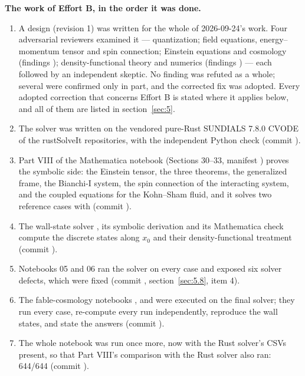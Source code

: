 \textbf{The work of Effort B, in the order it was done.}

\begin{enumerate}
  \item A design (revision 1) was written for the whole of 2026-09-24's work. Four adversarial reviewers examined it --- quantization; field equations, energy--momentum tensor and spin connection; Einstein equations and cosmology (findings ); density-functional theory and numerics (findings ) --- each followed by an independent skeptic. No finding was refuted as a whole; several were confirmed only in part, and the corrected fix was adopted. Every adopted correction that concerns Effort B is stated where it applies below, and all of them are listed in section~\ref{sec:5}.
  \item The solver  was written on the vendored pure-Rust SUNDIALS 7.8.0 CVODE of the rustSolveIt repositories, with the independent Python check  (commit ).
  \item Part VIII of the Mathematica notebook (Sections 30--33, manifest ) proves the symbolic side: the Einstein tensor, the three theorems, the generalized frame, the Bianchi-I system, the spin connection of the interacting system, and the coupled equations for the Kohn--Sham fluid, and it solves two reference cases with  (commit ).
  \item The wall-state solver , its symbolic derivation and its Mathematica check compute the discrete states along $x_{0}$ and their density-functional treatment (commit ).
  \item Notebooks 05 and 06 ran the solver on every case and exposed six solver defects, which were fixed (commit , section~\ref{sec:5.8}, item 4).
  \item The fable-cosmology notebooks ,  and  were executed on the final solver; they run every case, re-compute every run independently, reproduce the wall states, and state the answers (commit ).
  \item The whole notebook was run once more, now with the Rust solver's CSVs present, so that Part VIII's comparison with the Rust solver also ran: 644/644 (commit ).
\end{enumerate}

